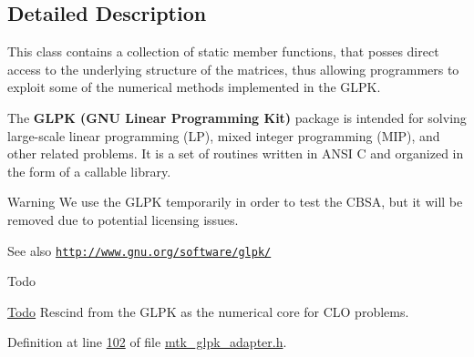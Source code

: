 \subsection{Detailed Description}
This class contains a collection of static member functions, that posses direct access to the underlying structure of the matrices, thus allowing programmers to exploit some of the numerical methods implemented in the G\+L\+P\+K.

The {\bfseries G\+L\+P\+K (G\+N\+U Linear Programming Kit)} package is intended for solving large-\/scale linear programming (L\+P), mixed integer programming (M\+I\+P), and other related problems. It is a set of routines written in A\+N\+S\+I C and organized in the form of a callable library.

\begin{DoxyWarning}{Warning}
We use the G\+L\+P\+K temporarily in order to test the C\+B\+S\+A, but it will be removed due to potential licensing issues.
\end{DoxyWarning}
\begin{DoxySeeAlso}{See also}
\href{http://www.gnu.org/software/glpk/}{\tt http\+://www.\+gnu.\+org/software/glpk/}
\end{DoxySeeAlso}
\begin{DoxyRefDesc}{Todo}
\item[\hyperlink{todo__todo000002}{Todo}]Rescind from the G\+L\+P\+K as the numerical core for C\+L\+O problems. \end{DoxyRefDesc}


Definition at line \hyperlink{mtk__glpk__adapter_8h_source_l00102}{102} of file \hyperlink{mtk__glpk__adapter_8h_source}{mtk\+\_\+glpk\+\_\+adapter.\+h}.



